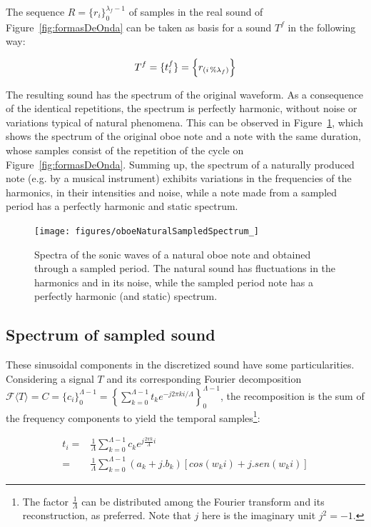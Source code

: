 The sequence $R=\{ r_i \}_0^{\lambda_f-1}$ of samples in the real sound of Figure~\ref{fig:formasDeOnda} can be taken as basis for a sound $T^f$ in the following way:

\begin{equation}\label{sampleandoFormaDeOnda}
     T^f=\{ t_i^f \}=\Bigl\{ r_{(i\,\%\lambda_{f})} \Bigr\}
\end{equation}

The resulting sound has the spectrum of the original waveform. As a consequence of the identical repetitions, the spectrum is perfectly harmonic, without noise or variations typical of natural phenomena. This can be observed in Figure~\ref{fig:espectroOboe}, which shows the spectrum of the original oboe note and a note with the same duration, whose samples consist of the repetition of the cycle on Figure~\ref{fig:formasDeOnda}. Summing up, the spectrum of a naturally produced note (e.g. by a musical instrument) exhibits variations in the frequencies of the harmonics, in their intensities and noise, while a note made from a sampled period has a perfectly harmonic and static spectrum.

\begin{figure}
    \centering
        \texttt{[image: figures/oboeNaturalSampledSpectrum\_]}
	\caption{Spectra of the sonic waves of a natural oboe note and obtained through a sampled period. The natural sound has fluctuations in the harmonics and in its noise, while the sampled period note has a perfectly harmonic (and static) spectrum.}
        \label{fig:espectroOboe}
\end{figure}


\subsection{Spectrum of sampled sound}\label{sec:spectrum}
These sinusoidal components in the discretized sound have some particularities. Considering a signal $T$ and its corresponding Fourier decomposition $\mathcal{F}\langle T\rangle=C=\{c_i\}_0^{\Lambda-1}=\left\{ \sum_{k=0}^{\Lambda-1}t_ke^{-j2\pi ki/\Lambda} \right\}_0^{\Lambda-1}$, the recomposition is the sum of the frequency components to yield the temporal samples\footnote{The factor $\frac{1}{\Lambda}$ can be distributed among the Fourier transform and its reconstruction, as preferred. Note that $j$ here is the imaginary unit $j^2=-1$.}:

\begin{equation}\label{recomposicaoFourier}
\begin{split}
t_i = & \frac{1}{\Lambda}\sum_{k=0}^{\Lambda-1}c_ke^{j \frac{2\pi k}{\Lambda} i } \\ 
    = & \frac{1}{\Lambda}\sum_{k=0}^{\Lambda-1}(a_k+ j . b_k)\left[cos(w_k i)   +j . sen(w_k i)\right]
\end{split}
\end{equation}

